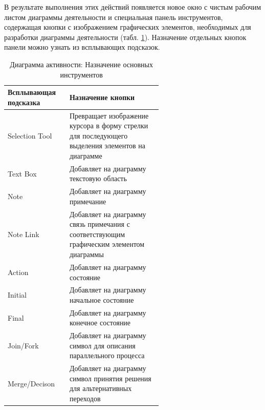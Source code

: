 \documentclass[a4paper,12pt]{extreport}
\begin{document}
В результате выполнения этих действий появляется новое окно с чистым рабочим листом диаграммы деятельности и специальная панель инструментов, содержащая кнопки с изображением графических элементов, необходимых для разработки диаграммы деятельности (табл. \ref{tab:activitytoolbox}). Назначение отдельных кнопок панели можно узнать из всплывающих подсказок.

\begin{table}[htbp]

	\begin{tabular}{|l|m{0.6\linewidth}|}
		\hline
		\textbf{Всплывающая подсказка} &\textbf{ Назначение кнопки} \\ \hline
		Selection Tool & Превращает изображение курсора в форму стрелки для последующего выделения элементов на диаграмме \\ \hline
		Text Box & Добавляет на диаграмму текстовую область \\ \hline
		Note & Добавляет на диаграмму примечание \\ \hline
		Note Link & Добавляет на диаграмму связь примечания с соответствующим графическим элементом диаграммы \\ \hline
		Action & Добавляет на диаграмму состояние \\ \hline
		Initial & Добавляет на диаграмму начальное состояние \\ \hline
		Final & Добавляет на диаграмму конечное состояние \\ \hline
		Join/Fork & Добавляет на диаграмму символ для описания параллельного процесса \\ \hline
		Merge/Decison & Добавляет на диаграмму символ принятия решения для альтернативных переходов \\ \hline
	\end{tabular}
	\caption{Диаграмма активности: Назначение основных инструментов}
	\label{tab:activitytoolbox}
\end{table}
\end{document}
